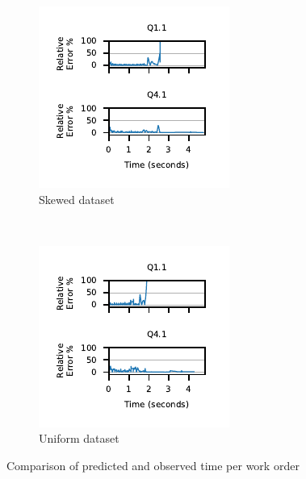 \begin{figure}[t]
	\centering
    \begin{subfigure}[b]{0.4\textheight}
    	\includegraphics[width=\textwidth]{policy/figures/q11-q41-prediction-accuracy-skew-data.pdf}
	\caption{Skewed dataset}    	
    \end{subfigure}%
	~    
    \begin{subfigure}[b]{0.4\textheight}
    	\includegraphics[width=\textwidth]{policy/figures/q11-q41-prediction-accuracy-uniform-data.pdf}
	\caption{Uniform dataset}    	    	
    \end{subfigure}%
	\caption{Comparison of predicted and observed time per work order}
	\label{fig:pred-vs-observed-time-per-wo}    
\end{figure}

